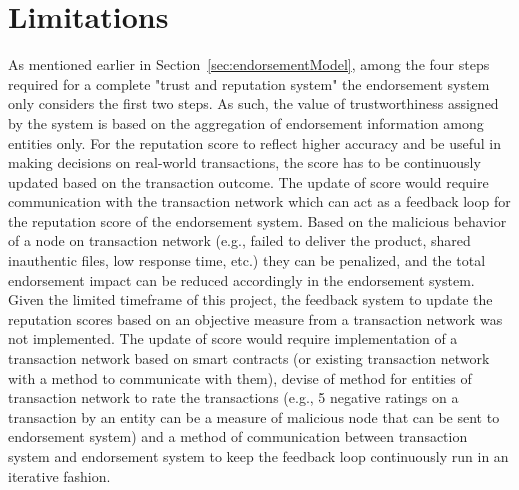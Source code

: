 \section{Limitations}
As mentioned earlier in Section~\ref{sec:endorsementModel}, among the four
steps required for a complete "trust and reputation system" the endorsement
system only considers the first two steps. As such, the value of
trustworthiness assigned by the system is based on the aggregation of
endorsement information among entities only. For the reputation score to
reflect higher accuracy and be useful in making decisions on real-world
transactions, the score has to be continuously updated based on the transaction
outcome. The update of score would require communication with the transaction
network which can act as a feedback loop for the reputation score of the
endorsement system. Based on the malicious behavior of a node on transaction
network (e.g., failed to deliver the product, shared inauthentic files, low
response time, etc.) they can be penalized, and the total endorsement impact
can be reduced accordingly in the endorsement system. Given the limited
timeframe of this project, the feedback system to update the reputation scores
based on an objective measure from a transaction network was not implemented.
The update of score would require implementation of a transaction network based
on smart contracts (or existing transaction network with a method to
communicate with them), devise of method for entities of transaction network to
rate the transactions (e.g., 5 negative ratings on a transaction by an entity
can be a measure of malicious node that can be sent to endorsement system) and
a method of communication between transaction system and endorsement system to
keep the feedback loop continuously run in an iterative fashion. 

